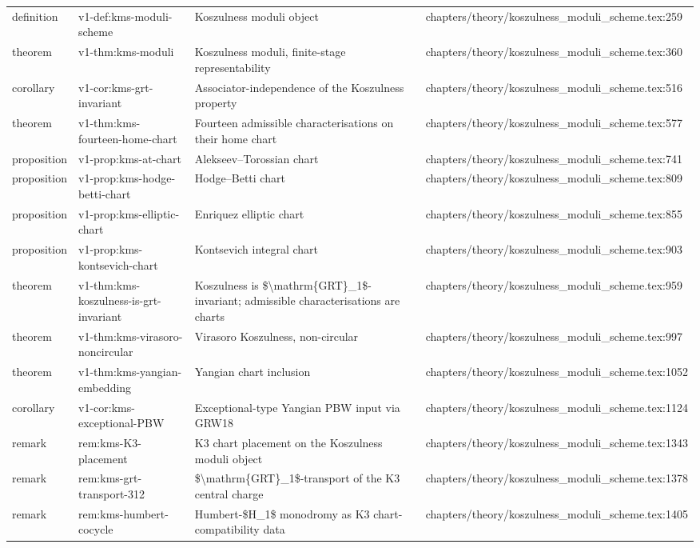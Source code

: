 \documentclass[11pt]{article}
\begin{document}
\begin{longtable}{L{0.10\textwidth}L{0.26\textwidth}L{0.42\textwidth}L{0.22\textwidth}}
definition & v1-def:kms-moduli-scheme & Koszulness moduli object & chapters/theory/koszulness\_moduli\_scheme.tex:259\\
theorem & v1-thm:kms-moduli & Koszulness moduli, finite-stage representability & chapters/theory/koszulness\_moduli\_scheme.tex:360\\
corollary & v1-cor:kms-grt-invariant & Associator-independence of the Koszulness property & chapters/theory/koszulness\_moduli\_scheme.tex:516\\
theorem & v1-thm:kms-fourteen-home-chart & Fourteen admissible characterisations on their home chart & chapters/theory/koszulness\_moduli\_scheme.tex:577\\
proposition & v1-prop:kms-at-chart & Alekseev--Torossian chart & chapters/theory/koszulness\_moduli\_scheme.tex:741\\
proposition & v1-prop:kms-hodge-betti-chart & Hodge--Betti chart & chapters/theory/koszulness\_moduli\_scheme.tex:809\\
proposition & v1-prop:kms-elliptic-chart & Enriquez elliptic chart & chapters/theory/koszulness\_moduli\_scheme.tex:855\\
proposition & v1-prop:kms-kontsevich-chart & Kontsevich integral chart & chapters/theory/koszulness\_moduli\_scheme.tex:903\\
theorem & v1-thm:kms-koszulness-is-grt-invariant & Koszulness is \$\textbackslash{}mathrm\{GRT\}\_1\$-invariant; admissible characterisations are charts & chapters/theory/koszulness\_moduli\_scheme.tex:959\\
theorem & v1-thm:kms-virasoro-noncircular & Virasoro Koszulness, non-circular & chapters/theory/koszulness\_moduli\_scheme.tex:997\\
theorem & v1-thm:kms-yangian-embedding & Yangian chart inclusion & chapters/theory/koszulness\_moduli\_scheme.tex:1052\\
corollary & v1-cor:kms-exceptional-PBW & Exceptional-type Yangian PBW input via GRW18 & chapters/theory/koszulness\_moduli\_scheme.tex:1124\\
remark & rem:kms-K3-placement & K3 chart placement on the Koszulness moduli object & chapters/theory/koszulness\_moduli\_scheme.tex:1343\\
remark & rem:kms-grt-transport-312 & \$\textbackslash{}mathrm\{GRT\}\_1\$-transport of the K3 central charge & chapters/theory/koszulness\_moduli\_scheme.tex:1378\\
remark & rem:kms-humbert-cocycle & Humbert-\$H\_1\$ monodromy as K3 chart-compatibility data & chapters/theory/koszulness\_moduli\_scheme.tex:1405\\

\end{longtable}
\end{document}
